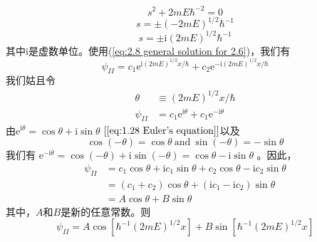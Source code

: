 	\begin{equation*}
		s^2 + 2mE\hbar^{-2}=0
	\end{equation*}
	\begin{equation}
		s = \pm \left(-2mE\right)^{1/2}\hbar^{-1}
		\label{eq:2.11}
	\end{equation}
	\begin{equation}
		s = \pm \mathrm{i}\left(2mE\right)^{1/2}\hbar^{-1}
		\label{eq:2.12}
	\end{equation}
	其中$\mathrm{i}$是虚数单位。使用(\ref{eq:2.8 general solution for 2.6})，我们有
	\begin{equation}
		\psi_{II} = c_1\mathrm{e}^{\mathrm{i} \left(2mE\right)^{1/2} x /\hbar}+c_2\mathrm{e}^{-\mathrm{i} \left(2mE\right)^{1/2} x /\hbar}
		\label{eq:2.13 general solution for particle between zero and l}
	\end{equation}
	我们姑且令
	\begin{equation*}
		\begin{aligned}
			\theta & \equiv \left(2mE\right)^{1/2} x /\hbar \\
			\psi_{II} & = c_1\mathrm{e}^{\mathrm{i}\theta}+c_1\mathrm{e}^{-\mathrm{i}\theta}
		\end{aligned}
	\end{equation*}
	由$\mathrm{e}^{\mathrm{i}\theta} = \cos\theta+\mathrm{i}\sin\theta$ $\left[\ref{eq:1.28 Euler's equation}\right]$以及
	\begin{equation}
		\boxed{
			\cos\left(-\theta\right) = \cos\theta \: \text{and} \: \sin\left(-\theta\right) = -\sin\theta
		}
		\label{eq:2.14 properties of sin and cos}
	\end{equation}
	我们有
	$\mathrm{e}^{-\mathrm{i}\theta} = \cos \left(-\theta\right)+\mathrm{i}\sin\left(-\theta\right)=\cos\theta-\mathrm{i}\sin\theta$
	。因此，
	\begin{equation*}
		\begin{aligned}
			\psi_{II} & =c_1\cos\theta+\mathrm{i}c_1\sin\theta+c_2\cos\theta-\mathrm{i}c_2\sin\theta \\
			& = \left(c_1+c_2\right)\cos\theta+\left(\mathrm{i}c_1-\mathrm{i}c_2\right)\sin\theta \\
			& = A \cos\theta + B\sin\theta 
		\end{aligned}	
	\end{equation*}
	其中，$A$和$B$是新的任意常数。则
	\begin{equation}
		\psi_{II}= A \cos\left[\hbar^{-1}\left(2mE\right)^{1/2}x\right]+B \sin\left[\hbar^{-1}\left(2mE\right)^{1/2}x\right]
		\label{eq:2.15 complete wave function of psi ii}
	\end{equation}
